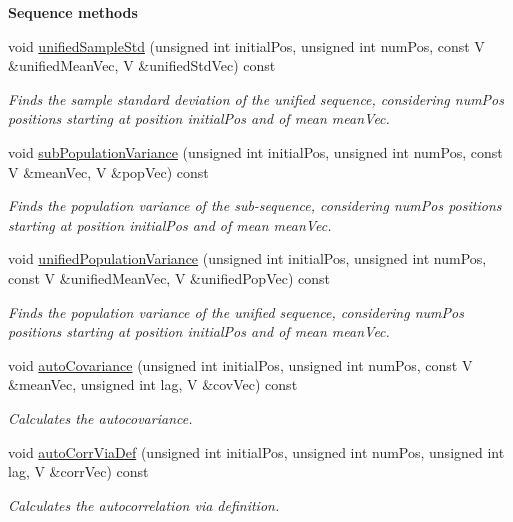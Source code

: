\begin{Indent}{\bf Sequence methods}
\begin{DoxyCompactItemize}
void \hyperlink{class_q_u_e_s_o_1_1_sequence_of_vectors_a3cdf3e5902d9e543b67a5e1656d33eaa}{unified\-Sample\-Std} (unsigned int initial\-Pos, unsigned int num\-Pos, const V \&unified\-Mean\-Vec, V \&unified\-Std\-Vec) const 
\begin{DoxyCompactList}\small\item\em Finds the sample standard deviation of the unified sequence, considering {\ttfamily num\-Pos} positions starting at position {\ttfamily initial\-Pos} and of mean {\ttfamily mean\-Vec}. \end{DoxyCompactList}\item 
void \hyperlink{class_q_u_e_s_o_1_1_sequence_of_vectors_ae6041aecbc1abb2f4e0981914dd5c0ca}{sub\-Population\-Variance} (unsigned int initial\-Pos, unsigned int num\-Pos, const V \&mean\-Vec, V \&pop\-Vec) const 
\begin{DoxyCompactList}\small\item\em Finds the population variance of the sub-\/sequence, considering {\ttfamily num\-Pos} positions starting at position {\ttfamily initial\-Pos} and of mean {\ttfamily mean\-Vec}. \end{DoxyCompactList}\item 
void \hyperlink{class_q_u_e_s_o_1_1_sequence_of_vectors_a8d4648246e0c0f5df4b38a1eb8e90e04}{unified\-Population\-Variance} (unsigned int initial\-Pos, unsigned int num\-Pos, const V \&unified\-Mean\-Vec, V \&unified\-Pop\-Vec) const 
\begin{DoxyCompactList}\small\item\em Finds the population variance of the unified sequence, considering {\ttfamily num\-Pos} positions starting at position {\ttfamily initial\-Pos} and of mean {\ttfamily mean\-Vec}. \end{DoxyCompactList}\item 
void \hyperlink{class_q_u_e_s_o_1_1_sequence_of_vectors_a190622cf14733c11b48d153f98ee1525}{auto\-Covariance} (unsigned int initial\-Pos, unsigned int num\-Pos, const V \&mean\-Vec, unsigned int lag, V \&cov\-Vec) const 
\begin{DoxyCompactList}\small\item\em Calculates the autocovariance. \end{DoxyCompactList}\item 
void \hyperlink{class_q_u_e_s_o_1_1_sequence_of_vectors_a5f49d2dcabf21016d3c210ffa5f12462}{auto\-Corr\-Via\-Def} (unsigned int initial\-Pos, unsigned int num\-Pos, unsigned int lag, V \&corr\-Vec) const 
\begin{DoxyCompactList}\small\item\em Calculates the autocorrelation via definition. \end{DoxyCompactList}\item 

\end{DoxyCompactItemize}
\end{Indent}
